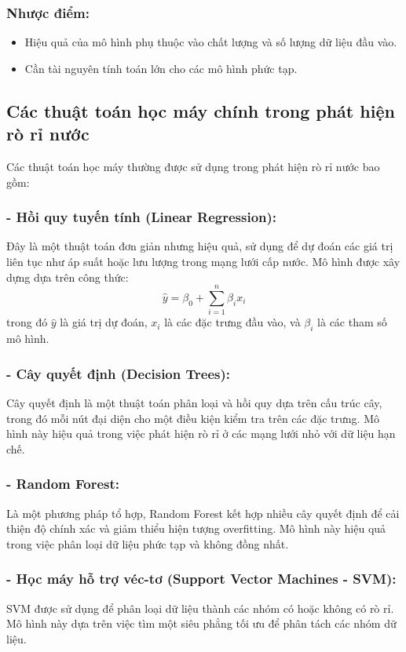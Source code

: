 \subsubsection{Nhược điểm:}
\begin{itemize}
    \item Hiệu quả của mô hình phụ thuộc vào chất lượng và số lượng dữ liệu đầu vào.
    \item Cần tài nguyên tính toán lớn cho các mô hình phức tạp.
\end{itemize}

\subsection{Các thuật toán học máy chính trong phát hiện rò rỉ nước}
Các thuật toán học máy thường được sử dụng trong phát hiện rò rỉ nước bao gồm:

\subsubsection{- Hồi quy tuyến tính (Linear Regression):}
Đây là một thuật toán đơn giản nhưng hiệu quả, sử dụng để dự đoán các giá trị liên tục như áp suất hoặc lưu lượng trong mạng lưới cấp nước. Mô hình được xây dựng dựa trên công thức:
\[
\hat{y} = \beta_0 + \sum_{i=1}^n \beta_i x_i
\]
trong đó \(\hat{y}\) là giá trị dự đoán, \(x_i\) là các đặc trưng đầu vào, và \(\beta_i\) là các tham số mô hình.

\subsubsection{- Cây quyết định (Decision Trees):}
Cây quyết định là một thuật toán phân loại và hồi quy dựa trên cấu trúc cây, trong đó mỗi nút đại diện cho một điều kiện kiểm tra trên các đặc trưng. Mô hình này hiệu quả trong việc phát hiện rò rỉ ở các mạng lưới nhỏ với dữ liệu hạn chế.

\subsubsection{- Random Forest:}
Là một phương pháp tổ hợp, Random Forest kết hợp nhiều cây quyết định để cải thiện độ chính xác và giảm thiểu hiện tượng overfitting. Mô hình này hiệu quả trong việc phân loại dữ liệu phức tạp và không đồng nhất.

\subsubsection{- Học máy hỗ trợ véc-tơ (Support Vector Machines - SVM):}
SVM được sử dụng để phân loại dữ liệu thành các nhóm có hoặc không có rò rỉ. Mô hình này dựa trên việc tìm một siêu phẳng tối ưu để phân tách các nhóm dữ liệu.


